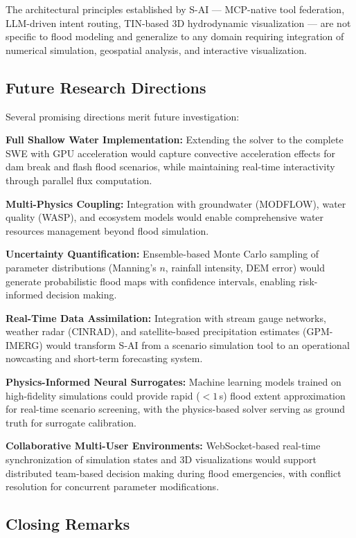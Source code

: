 \documentclass[11pt, a4paper]{article}
\begin{document}
\noindent The architectural principles established by S-AI --- MCP-native tool federation, LLM-driven intent routing, TIN-based 3D hydrodynamic visualization --- are not specific to flood modeling and generalize to any domain requiring integration of numerical simulation, geospatial analysis, and interactive visualization.

\subsection{Future Research Directions}

Several promising directions merit future investigation:

\textbf{Full Shallow Water Implementation:} Extending the solver to the complete SWE with GPU acceleration would capture convective acceleration effects for dam break and flash flood scenarios, while maintaining real-time interactivity through parallel flux computation.

\textbf{Multi-Physics Coupling:} Integration with groundwater (MODFLOW), water quality (WASP), and ecosystem models would enable comprehensive water resources management beyond flood simulation.

\textbf{Uncertainty Quantification:} Ensemble-based Monte Carlo sampling of parameter distributions (Manning's $n$, rainfall intensity, DEM error) would generate probabilistic flood maps with confidence intervals, enabling risk-informed decision making.

\textbf{Real-Time Data Assimilation:} Integration with stream gauge networks, weather radar (CINRAD), and satellite-based precipitation estimates (GPM-IMERG) would transform S-AI from a scenario simulation tool to an operational nowcasting and short-term forecasting system.

\textbf{Physics-Informed Neural Surrogates:} Machine learning models trained on high-fidelity simulations could provide rapid ($<1$\,s) flood extent approximation for real-time scenario screening, with the physics-based solver serving as ground truth for surrogate calibration.

\textbf{Collaborative Multi-User Environments:} WebSocket-based real-time synchronization of simulation states and 3D visualizations would support distributed team-based decision making during flood emergencies, with conflict resolution for concurrent parameter modifications.

\subsection{Closing Remarks}
\end{document}
